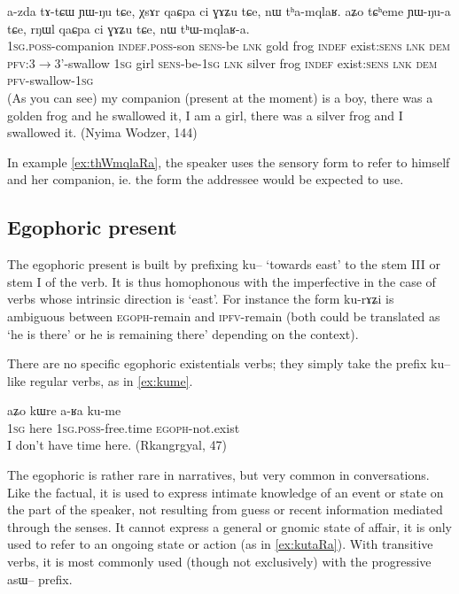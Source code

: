 \documentclass[oldfontcommands,oneside,a4paper,11pt]{article}
\newcommand{\ipa}[1]{{\phon \mbox{#1}}} %
\begin{document}
\begin{exe}
\ex \label{ex:thWmqlaRa}
\gll
\ipa{a-zda}  	\ipa{tɤ-tɕɯ}  	\ipa{ɲɯ-ŋu}  	\ipa{tɕe,}  	\ipa{χsɤr}  	\ipa{qaɕpa}  	\ipa{ci}  	\ipa{ɣɤʑu}  	\ipa{tɕe,}  	\ipa{nɯ}  	\ipa{tʰa-mqlaʁ.} \ipa{aʑo}  	\ipa{tɕʰeme}  	\ipa{ɲɯ-ŋu-a}  	\ipa{tɕe,}  	\ipa{rŋɯl}  	\ipa{qaɕpa}  	\ipa{ci}  	\ipa{ɣɤʑu}  	\ipa{tɕe,}  	\ipa{nɯ}  	\ipa{tʰɯ-mqlaʁ-a.}  \\
\textsc{1sg.poss}-companion \textsc{indef.poss}-son \textsc{sens}-be  \textsc{lnk} gold frog \textsc{indef} exist:\textsc{sens} \textsc{lnk} \textsc{dem} \textsc{pfv}:3$\rightarrow$3'-swallow \textsc{1sg} girl \textsc{sens}-be-\textsc{1sg}  \textsc{lnk} silver frog \textsc{indef} exist:\textsc{sens} \textsc{lnk} \textsc{dem} \textsc{pfv}-swallow-\textsc{1sg} \\
\glt (As you can see) my companion (present at the moment) is a boy, there was a golden frog and he swallowed it, I am a girl, there was a silver frog and I swallowed it. (Nyima Wodzer, 144)
\end{exe}

In example \ref{ex:thWmqlaRa}, the speaker uses the sensory form to refer to himself and her companion, ie. the form the addressee would be expected to use. 


\subsection{Egophoric present } \label{sec:eggoph}
The egophoric present  is built by prefixing \ipa{ku--} `towards east' to the stem III or stem I of the verb. It is thus homophonous with the imperfective in the case of verbs whose intrinsic direction is `east'.  For instance the form \ipa{ku-rɤʑi} is ambiguous between \textsc{egoph}-remain and \textsc{ipfv}-remain (both could be translated as `he is there' or he is remaining there' depending on the context).

There are no specific egophoric   existentials verbs; they simply take the prefix \ipa{ku--} like regular verbs, as in \ref{ex:kume}.

\begin{exe}
\ex \label{ex:kume}
\gll 
\ipa{aʑo}  	\ipa{kɯre}  	\ipa{a-ʁa}  	\ipa{ku-me}  	\\
\textsc{1sg} here \textsc{1sg.poss}-free.time \textsc{egoph}-not.exist \\
\glt I don't have time here. (Rkangrgyal, 47)
\end{exe}

The egophoric  is rather rare in narratives, but very common in conversations. Like the factual, it is used to express intimate knowledge of an event or state on the part of the speaker, not resulting from guess or recent information mediated through the senses. It cannot express a general or gnomic state of affair, it is only used to refer to an ongoing state or action (as in \ref{ex:kutaRa}). With transitive verbs, it is most commonly used (though not exclusively) with the progressive \ipa{asɯ--} prefix.
\end{document}
